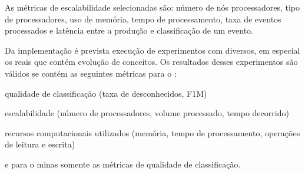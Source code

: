 

As métricas de escalabilidade selecionadas são: número de nós processadores, tipo
de processadores, uso de memória, tempo de processamento, taxa de eventos
processados e latência entre a produção e classificação de um evento.



Da implementação \mfog é prevista execução de experimentos com \datasets
diversos, em especial os \datasets reais que contém evolução de conceitos.
Os resultados desses experimentos são válidos se contém as seguintes métricas
para o \mfog: \begin{enumerate*}[label={\alph*)}]
  \item qualidade de classificação (taxa de desconhecidos, F1M)
  \item escalabilidade (número de processadores, volume processado, tempo decorrido)
  \item recursos computacionais utilizados (memória, tempo de processamento, operações de leitura e escrita)
\end{enumerate*}
e para o minas somente as métricas de qualidade de classificação.


